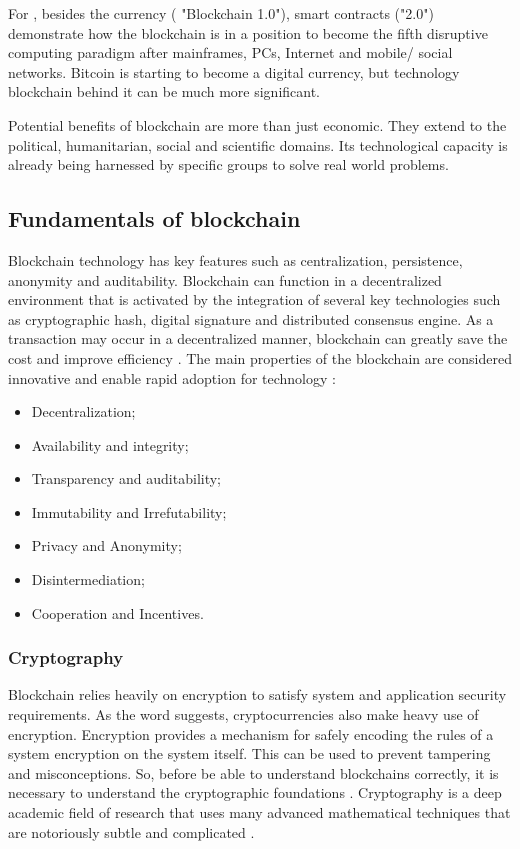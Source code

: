 For \cite{swan2015blockchain}, besides the currency ( "Blockchain 1.0"), smart contracts ("2.0") demonstrate how the blockchain is in a position to become the fifth disruptive computing paradigm after mainframes, PCs, Internet and mobile/ social networks. Bitcoin is starting to become a digital currency, but technology blockchain behind it can be much more significant.

Potential benefits of blockchain are more than just economic. They extend to the political, humanitarian, social and scientific domains. Its technological capacity is already being harnessed by specific groups to solve real world problems.

\subsection{Fundamentals of blockchain}\label{sec:fundamentals}
Blockchain technology has key features such as centralization, persistence, anonymity and auditability. Blockchain can function in a decentralized environment that is activated by the integration of several key technologies such as cryptographic hash, digital signature and distributed consensus engine. As a transaction may occur in a decentralized manner, blockchain can greatly save the cost and improve efficiency \cite{zheng2016blockchain}. The main properties of the blockchain are considered innovative and enable rapid adoption for technology \cite{greve2018blockchain}:

\begin{itemize}
\item Decentralization;
\item Availability and integrity;
\item Transparency and auditability;
\item Immutability and Irrefutability;
\item Privacy and Anonymity;
\item Disintermediation;
\item Cooperation and Incentives.
\end{itemize}


\subsubsection{Cryptography}\label{sec:criptografia}
Blockchain relies heavily on encryption to satisfy system and application security requirements. As the word suggests, cryptocurrencies also make heavy use of encryption. Encryption provides a mechanism for safely encoding the rules of a system encryption on the system itself. This can be used to prevent tampering and misconceptions. So, before be able to understand blockchains correctly, it is necessary to understand the cryptographic foundations \cite{narayanan2016bitcoin}. Cryptography is a deep academic field of research that uses many advanced mathematical techniques that are notoriously subtle and complicated \cite{narayanan2016bitcoin}.

